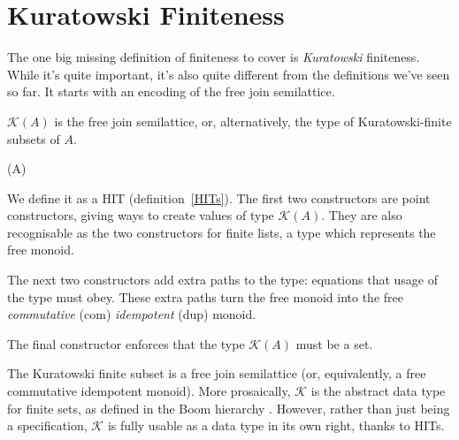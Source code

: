 \section{Kuratowski Finiteness} \label{kuratowski}
The one big missing definition of finiteness to cover is \emph{Kuratowski}
finiteness.
While it's quite important, it's also quite different from the definitions we've
seen so far.
It starts with an encoding of the free join semilattice.
\begin{definition}
  \(\mathcal{K}(A)\) is the free join semilattice, or, alternatively, the type
  of Kuratowski-finite subsets of \(A\).
  \begin{inductivetype}{(A)}
  \end{inductivetype}
  We define it as a HIT (definition~\ref{HITs}).
  The first two constructors are point constructors, giving ways to create
  values of type \(\mathcal{K}(A)\).
  They are also recognisable as the two constructors for finite lists, a type
  which represents the free monoid.

  The next two constructors add extra paths to the type: equations that usage of
  the type must obey.
  These extra paths turn the free monoid into the free \emph{commutative} (com)
  \emph{idempotent} (dup) monoid.

  The final constructor enforces that the type \(\mathcal{K}(A)\) must be a set.
\end{definition}
The Kuratowski finite subset is a free join semilattice (or, equivalently, a
free commutative idempotent monoid).
More prosaically, \(\mathcal{K}\) is the abstract data type for finite sets, as
defined in the Boom hierarchy \cite{boomFurtherThoughtsAbstracto1981,
  bunkenburgBoomHierarchy1994}.
However, rather than just being a specification, \(\mathcal{K}\) is fully usable
as a data type in its own right, thanks to HITs.

